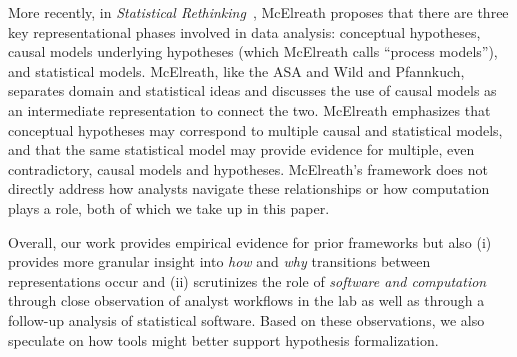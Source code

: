 More recently, in \textit{Statistical
Rethinking}~\cite{mcelreath2020statistical}, McElreath proposes that
there are three key representational phases involved in data analysis:
conceptual hypotheses, causal models underlying hypotheses (which McElreath
calls ``process models''), and statistical models. McElreath, like the ASA and
Wild and Pfannkuch, separates domain and statistical ideas and discusses the use
of causal models as an intermediate representation to connect
the two. McElreath emphasizes that conceptual hypotheses may correspond to
multiple causal and statistical models, and that the same statistical
model may provide evidence for multiple, even contradictory, causal models and
hypotheses. McElreath's framework does not directly address how analysts navigate
these relationships or how computation plays a role, both of which we take up in
this paper. 

Overall, our work provides empirical evidence for prior frameworks but also (i)
provides more granular insight into \textit{how} and \textit{why} transitions between
representations occur and (ii) scrutinizes the role of
\textit{software and computation} through close observation of analyst workflows
in the lab as well as through a follow-up analysis of statistical software. Based on
these observations, we also speculate on how tools might better support hypothesis
formalization.
